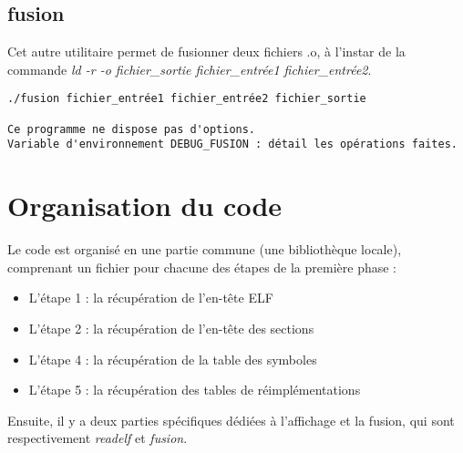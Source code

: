\documentclass[a4paper,11pt]{article}
\begin{document}
\subsection{fusion}
Cet autre utilitaire permet de fusionner deux fichiers .o, à l'instar de la commande \textit{ld -r -o fichier\_sortie fichier\_entrée1 fichier\_entrée2}.
\begin{verbatim}
./fusion fichier_entrée1 fichier_entrée2 fichier_sortie

Ce programme ne dispose pas d'options.
Variable d'environnement DEBUG_FUSION : détail les opérations faites.
\end{verbatim}

\section{Organisation du code}
Le code est organisé en une partie commune (une bibliothèque locale), comprenant un fichier pour chacune des étapes de la première phase :
\begin{itemize}
\item L'étape 1 : la récupération de l'en-tête ELF
\item L'étape 2 : la récupération de l'en-tête des sections
\item L'étape 4 : la récupération de la table des symboles
\item L'étape 5 : la récupération des tables de réimplémentations 
\end{itemize}

Ensuite, il y a deux parties spécifiques dédiées à l'affichage et la fusion, qui sont respectivement \textit{readelf} et \textit{fusion}.
\end{document}
